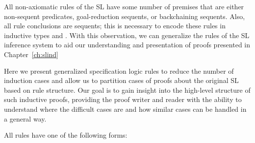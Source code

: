 




All non-axiomatic rules of the SL have some number of premises that are either non-sequent predicates, goal-reduction sequents, or backchaining sequents. Also, all rule conclusions are sequents; this is necessary to encode these rules in inductive types  and . With this observation, we can generalize the rules of the SL inference system to aid our understanding and presentation of proofs presented in Chapter~\ref{ch:slind}

Here we present generalized specification logic rules to reduce the number of induction cases and allow us to partition cases of proofs about the original SL based on rule structure. Our goal is to gain insight into the high-level structure of such inductive proofs, providing the proof writer and reader with the ability to understand where the difficult cases are and how similar cases can be handled in a general way.

All rules have one of the following forms:

